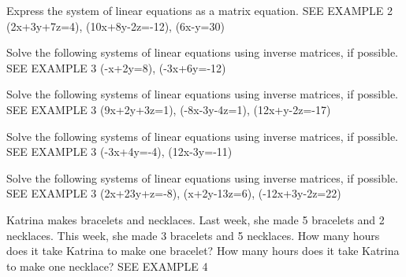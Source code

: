 \documentclass{article}
\newenvironment{practice}[2]{}{}        %
\newcommand{\answer}[1]{}               %
\newcommand{\placeholder}[2]{}          %
\begin{document}
\begin{practice}{17}{1}
Express the system of linear equations as a matrix equation. SEE EXAMPLE 2
(2x+3y+7z=4), (10x+8y-2z=-12), (6x-y=30)
\answer{(\begin{bmatrix}2&3&7\\10&8&-2\\6&-1&0\end{bmatrix}\cdot\begin{bmatrix}x\\y\\z\end{bmatrix}=\begin{bmatrix}4\\-12\\30\end{bmatrix})}
\end{practice}
\begin{practice}{18}{1}
Solve the following systems of linear equations using inverse matrices, if possible. SEE EXAMPLE 3
(-x+2y=8), (-3x+6y=-12)
\answer{no solution}
\end{practice}
\begin{practice}{19}{1}
Solve the following systems of linear equations using inverse matrices, if possible. SEE EXAMPLE 3
(9x+2y+3z=1), (-8x-3y-4z=1), (12x+y-2z=-17)
\answer{(x=0), (y=-7), (z=5)}
\end{practice}
\begin{practice}{20}{1}
Solve the following systems of linear equations using inverse matrices, if possible. SEE EXAMPLE 3
(-3x+4y=-4), (\frac12x-3y=-11)
\answer{(x=8), (y=5)}
\end{practice}
\begin{practice}{21}{1}
Solve the following systems of linear equations using inverse matrices, if possible. SEE EXAMPLE 3
(2x+\frac23y+z=-8), (x+2y-\frac13z=6), (-\frac12x+3y-2z=22)
\answer{(x=-2), (y=3), (z=-6)}
\end{practice}
\begin{practice}{22}{2}
Katrina makes bracelets and necklaces. Last week, she made 5 bracelets and 2 necklaces. This week, she made 3 bracelets and 5 necklaces. How many hours does it take Katrina to make one bracelet? How many hours does it take Katrina to make one necklace? SEE EXAMPLE 4
\placeholder{illustration}{Jewelry displays: left two necklaces and five bracelets, clock labeled 16 hours; right five necklaces and three bracelets, clock labeled 21 hours.}
\answer{2 hr to make one bracelet and 3 hr to make one necklace}
\end{practice}
\end{document}
